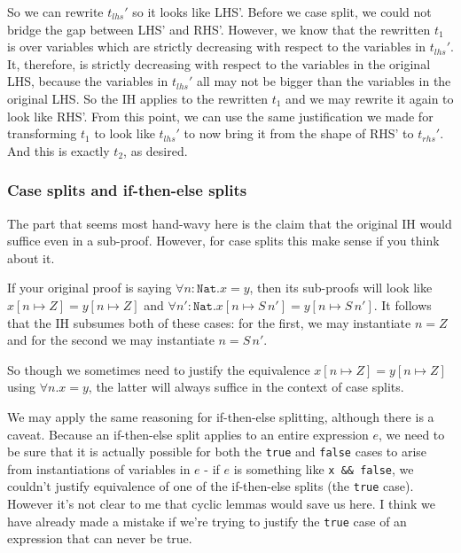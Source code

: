 \documentclass{article}[11pt]
\newcommand{\next}[1]{S \, #1}
\begin{document}
So we can rewrite \(t_{lhs}'\) so it looks like LHS'. Before we case split, we
could not bridge the gap between LHS' and RHS'. However, we know that the
rewritten \(t_{1}\) is over variables which are strictly decreasing with respect
to the variables in \(t_{lhs}'\). It, therefore, is strictly decreasing with
respect to the variables in the original LHS, because the variables in
\(t_{lhs}'\) all may not be bigger than the variables in the original LHS. So
the IH applies to the rewritten \(t_{1}\) and we may rewrite it again to look
like RHS'. From this point, we can use the same justification we made for
transforming \(t_{1}\) to look like \(t_{lhs}'\) to now bring it from the shape
of RHS' to \(t_{rhs}'\). And this is exactly \(t_{2}\), as desired.

\subsubsection{Case splits and if-then-else splits}

The part that seems most hand-wavy here is the claim that the original IH would
suffice even in a sub-proof. However, for case splits this make sense if you
think about it.

If your original proof is saying \(\forall n: \texttt{Nat} . x = y\), then its
sub-proofs will look like \(x[n \mapsto Z] = y[n \mapsto Z]\) and
\(\forall n': \texttt{Nat}. x[n \mapsto \next {n'}] = y[n \mapsto \next {n'}]\).
It follows that the IH subsumes both of these cases: for the first, we may
instantiate \(n = Z\) and for the second we may instantiate \(n = \next {n'}\).

So though we sometimes need to justify the equivalence
\(x[n \mapsto Z] = y[n \mapsto Z]\) using \(\forall n. x = y\), the latter will
always suffice in the context of case splits.

We may apply the same reasoning for if-then-else splitting, although there is a
caveat. Because an if-then-else split applies to an entire expression \(e\), we
need to be sure that it is actually possible for both the \texttt{true} and
\texttt{false} cases to arise from instantiations of variables in \(e\) - if
\(e\) is something like \texttt{x \&\& false}, we couldn't justify equivalence of
one of the if-then-else splits (the \texttt{true} case). However it's not clear
to me that cyclic lemmas would save us here. I think we have already made a
mistake if we're trying to justify the \texttt{true} case of an expression that
can never be true.
\end{document}

